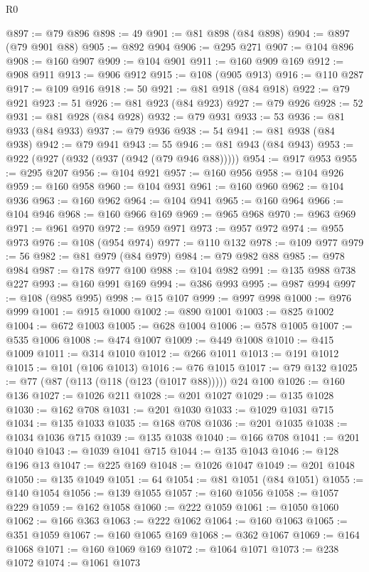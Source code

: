 \begin{lexlean}{R0}
\begin{coremodule}
@897 := @79 @896
@898 := 49
@901 := @81 @898 (@84 @898)
@904 := @897 (@79 @901 @88)
@905 := @892 @904
@906 := @295 @271
@907 := @104 @896
@908 := @160 @907
@909 := @104 @901
@911 := @160 @909 @169
@912 := @908 @911
@913 := @906 @912
@915 := @108 (@905 @913)
@916 := @110 @287
@917 := @109 @916
@918 := 50
@921 := @81 @918 (@84 @918)
@922 := @79 @921
@923 := 51
@926 := @81 @923 (@84 @923)
@927 := @79 @926
@928 := 52
@931 := @81 @928 (@84 @928)
@932 := @79 @931
@933 := 53
@936 := @81 @933 (@84 @933)
@937 := @79 @936
@938 := 54
@941 := @81 @938 (@84 @938)
@942 := @79 @941
@943 := 55
@946 := @81 @943 (@84 @943)
@953 := @922 (@927 (@932 (@937 (@942 (@79 @946 @88)))))
@954 := @917 @953
@955 := @295 @207
@956 := @104 @921
@957 := @160 @956
@958 := @104 @926
@959 := @160 @958
@960 := @104 @931
@961 := @160 @960
@962 := @104 @936
@963 := @160 @962
@964 := @104 @941
@965 := @160 @964
@966 := @104 @946
@968 := @160 @966 @169
@969 := @965 @968
@970 := @963 @969
@971 := @961 @970
@972 := @959 @971
@973 := @957 @972
@974 := @955 @973
@976 := @108 (@954 @974)
@977 := @110 @132
@978 := @109 @977
@979 := 56
@982 := @81 @979 (@84 @979)
@984 := @79 @982 @88
@985 := @978 @984
@987 := @178 @977 @100
@988 := @104 @982
@991 := @135 @988 @738 @227
@993 := @160 @991 @169
@994 := @386 @993
@995 := @987 @994
@997 := @108 (@985 @995)
@998 := @15 @107
@999 := @997 @998
@1000 := @976 @999
@1001 := @915 @1000
@1002 := @890 @1001
@1003 := @825 @1002
@1004 := @672 @1003
@1005 := @628 @1004
@1006 := @578 @1005
@1007 := @535 @1006
@1008 := @474 @1007
@1009 := @449 @1008
@1010 := @415 @1009
@1011 := @314 @1010
@1012 := @266 @1011
@1013 := @191 @1012
@1015 := @101 (@106 @1013)
@1016 := @76 @1015
@1017 := @79 @132
@1025 := @77 (@87 (@113 (@118 (@123 (@1017 @88))))) @24 @100
@1026 := @160 @136
@1027 := @1026 @211
@1028 := @201 @1027
@1029 := @135 @1028
@1030 := @162 @708
@1031 := @201 @1030
@1033 := @1029 @1031 @715
@1034 := @135 @1033
@1035 := @168 @708
@1036 := @201 @1035
@1038 := @1034 @1036 @715
@1039 := @135 @1038
@1040 := @166 @708
@1041 := @201 @1040
@1043 := @1039 @1041 @715
@1044 := @135 @1043
@1046 := @128 @196 @13
@1047 := @225 @169
@1048 := @1026 @1047
@1049 := @201 @1048
@1050 := @135 @1049
@1051 := 64
@1054 := @81 @1051 (@84 @1051)
@1055 := @140 @1054
@1056 := @139 @1055
@1057 := @160 @1056
@1058 := @1057 @229
@1059 := @162 @1058
@1060 := @222 @1059
@1061 := @1050 @1060
@1062 := @166 @363
@1063 := @222 @1062
@1064 := @160 @1063
@1065 := @351 @1059
@1067 := @160 @1065 @169
@1068 := @362 @1067
@1069 := @164 @1068
@1071 := @160 @1069 @169
@1072 := @1064 @1071
@1073 := @238 @1072
@1074 := @1061 @1073

\end{coremodule}
\end{lexlean}

